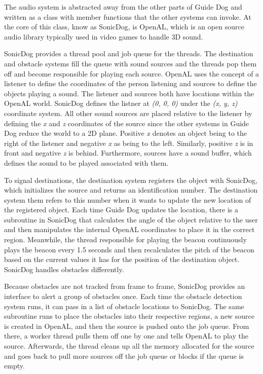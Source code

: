 The audio system is abstracted away from the other parts of Guide Dog and
written as a class with member functions that the other systems can invoke. At 
the core of this class, know as SonicDog, is OpenAL\cite{openal-website}, which 
is an open source audio library typically used in video games to handle 3D
sound. 

SonicDog provides a thread pool and job queue for the threads. The destination
and obstacle systems fill the queue with sound sources and the threads pop them
off and become responsible for playing each source. OpenAL uses the concept of a
listener to define the coordinates of the person listening and sources to define
the objects playing a sound. The listener and sources both have locations within
the OpenAL world. SonicDog defines the listner at \emph{(0, 0, 0)} under the
\emph{(x, y, z)} coordinate system. All other sound sources are placed relative 
to the listener by defining the \emph{x} and \emph{z} coordinates of the source 
since the other systems in Guide Dog reduce the world to a 2D plane. Positive
\emph{x} denotes an object being to the right of the listener and negative 
\emph{x} as being to the left. Similarly, positive \emph{z} is in front and
negative \emph{z} is behind. Furthermore, sources have a sound buffer, which 
defines the sound to be played associated with them.

To signal destinations, the destination system registers the object with
SonicDog, which initializes the source and returns an identification number. 
The destination system them refers to this number when it wants to update the 
new location of the registered object. Each time Guide Dog updates the location,
there is a subroutine in SonicDog that calculates the angle of the object 
relative to the user and then manipulates the internal OpenAL coordinates to 
place it in the correct region. Meanwhile, the thread responsible for playing 
the beacon continuously plays the beacon every 1.5 seconds and then 
recalculates the pitch of the beacon based on the current values it has for the 
position of the destination object. SonicDog handles obstacles differently.

Because obstacles are not tracked from frame to frame, SonicDog provides an
interface to alert a group of obstacles once. Each time the obstacle detection
system runs, it can pass in a list of obstacle locations to SonicDog. The same
subroutine runs to place the obstacles into their respective regions, a new
source is created in OpenAL, and then the source is pushed onto the job queue.
From there, a worker thread pulls them off one by one and tells OpenAL to play
the source. Afterwards, the thread cleans up all the memory allocated for the
source and goes back to pull more sources off the job queue or blocks if the 
queue is empty.

